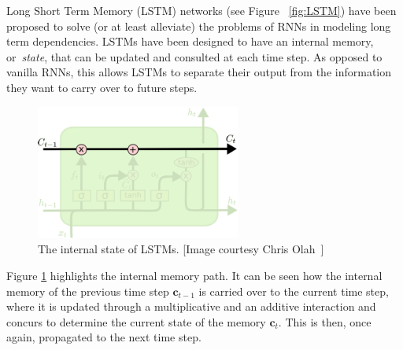 Long Short Term Memory (LSTM) networks (see Figure ~\ref{fig:LSTM}) have been proposed to solve (or at least alleviate) the problems of RNNs in modeling long term dependencies. LSTMs have been designed to have an internal memory, or~\emph{state}, that can be updated and consulted at each time step. As opposed to vanilla RNNs, this allows LSTMs to separate their output from the information they want to carry over to future steps.

\begin{figure}[t]
	\centering
	\includegraphics[width=0.6\textwidth]{figures/LSTM_state.pdf}
	\caption{The internal state of LSTMs. [Image courtesy Chris Olah~\cite{colah_15}]\label{fig:LSTM_state}}
\end{figure}

Figure \ref{fig:LSTM_state} highlights the internal memory path. It can be seen how the internal memory of the previous time step $\mathbf{c}_{t-1}$ is carried over to the current time step, where it is updated through a multiplicative and an additive interaction and concurs to determine the current state of the memory $\mathbf{c}_t$. This is then, once again, propagated to the next time step.


